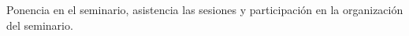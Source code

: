 Ponencia en el seminario, asistencia las sesiones y participaci\'{o}n en la organizaci\'{o}n del seminario.
